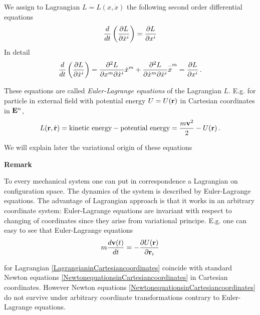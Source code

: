 \documentclass[12pt]{article}
\theoremstyle{theorem}
\numberwithin{equation}{section}
\begin{document}
{   We assign  to  Lagrangian $L=L(x,\dot x)$ the following second order differential equations
\begin{equation}\label{ELequations1}
    {d\over dt}\left({\partial L\over \partial \dot x^i}\right)={\partial L\over \partial  x^i}
\end{equation}
In detail
\begin{equation}\label{ELequationsindetail}
    {d\over dt}\left({\p L\over \p \dot x^i}\right)={\p^2 L\over \p x^m \p \dot x^i}\dot x^m+
    {\p^2 L\over \p \dot x^m \p \dot x^i}{\buildrel \cdot\cdot\over x^m}
    =
    {\p L\over \p  x^i}\,.
\end{equation}

  These equations are called {\it Euler-Lagrange equations} 
of the Lagrangian $L$. E.g. for particle in
external field with potential energy
 $U=U({\bf r})$ in Cartesian coordinates in ${\bf E}^n$,
               \begin{equation}\label{LagrangianinCartesiancoordinates}
         L({\bf r},\dot {{\bf r}})=\hbox {kinetic energy}-\hbox{potential energy}
 ={m{\bf v}^2\over 2}-U({\bf r})\,.
               \end{equation}\label{LagangianinCartesiancoordinates}
                


  We will explain later the variational origin of these equations
    
 {\bf Remark} {\footnotesize To every mechanical system one can put 
in correspondence  a Lagrangian on configuration space.
      The dynamics of the system is described by Euler-Lagrange equations.
      The advantage of Lagrangian approach is that it works in an arbitrary coordinate system:
      Euler-Lagrange equations are invariant
      with respect to changing of coordinates since 
they arise from variational principe.  E.g. one can easy to see that
  Euler-Lagrange equations  
                \begin{equation}\label{NewtonequationsinCartesiancoordinates}
  m{d{\bf v}(t)\over dt}=-{\partial U({\bf r})\over \partial {\bf r}_i}
               \end{equation}\label{LagangianinCartesiancoordinates}
                  
 for Lagrangian \eqref{LagrangianinCartesiancoordinates}
coincide with standard Newton equations
\eqref{NewtonequationsinCartesiancoordinates}
 in Cartesian coordinates.
However Newton equations 
 \eqref{NewtonequationsinCartesiancoordinates} 
do not survive under arbitrary coordinate transformations
contrary to Euler-Lagrange equations\label{ELequations1}.}

}
\end{document}
